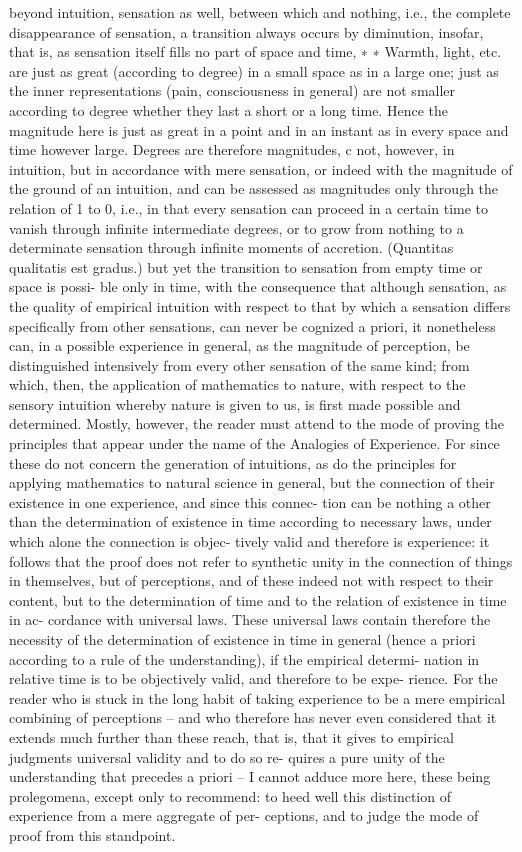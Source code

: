 beyond intuition, sensation as well, between which and nothing, i.e.,
the complete disappearance of sensation, a transition always occurs by
diminution, insofar, that is, as sensation itself ﬁlls no part of space and time, ∗
∗ Warmth, light, etc. are just as great (according to degree) in a small space as in a
large one; just as the inner representations (pain, consciousness in general) are
not smaller according to degree whether they last a short or a long time. Hence
the magnitude here is just as great in a point and in an instant as in every space
and time however large. Degrees are therefore magnitudes, c not, however, in
intuition, but in accordance with mere sensation, or indeed with the magnitude
of the ground of an intuition, and can be assessed as magnitudes only through
the relation of 1 to 0, i.e., in that every sensation can proceed in a certain
time to vanish through inﬁnite intermediate degrees, or to grow from nothing
to a determinate sensation through inﬁnite moments of accretion. (Quantitas
qualitatis est gradus.)
but yet the transition to sensation from empty time or space is possi-
ble only in time, with the consequence that although sensation, as the
quality of empirical intuition with respect to that by which a sensation
differs speciﬁcally from other sensations, can never be cognized a priori,
it nonetheless can, in a possible experience in general, as the magnitude
of perception, be distinguished intensively from every other sensation
of the same kind; from which, then, the application of mathematics to
nature, with respect to the sensory intuition whereby nature is given to
us, is ﬁrst made possible and determined.
Mostly, however, the reader must attend to the mode of proving the
principles that appear under the name of the Analogies of Experience.
For since these do not concern the generation of intuitions, as do the
principles for applying mathematics to natural science in general, but the
connection of their existence in one experience, and since this connec-
tion can be nothing a other than the determination of existence in time
according to necessary laws, under which alone the connection is objec-
tively valid and therefore is experience: it follows that the proof does not
refer to synthetic unity in the connection of things in themselves, but of
perceptions, and of these indeed not with respect to their content, but to
the determination of time and to the relation of existence in time in ac-
cordance with universal laws. These universal laws contain therefore the
necessity of the determination of existence in time in general (hence a
priori according to a rule of the understanding), if the empirical determi-
nation in relative time is to be objectively valid, and therefore to be expe-
rience. For the reader who is stuck in the long habit of taking experience
to be a mere empirical combining of perceptions – and who therefore has
never even considered that it extends much further than these reach, that
is, that it gives to empirical judgments universal validity and to do so re-
quires a pure unity of the understanding that precedes a priori – I cannot
adduce more here, these being prolegomena, except only to recommend:
to heed well this distinction of experience from a mere aggregate of per-
ceptions, and to judge the mode of proof from this standpoint.

